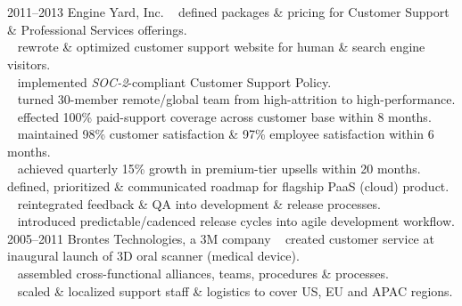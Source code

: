 \documentclass[]{friggeri-cv} %
\begin{document}
\section{{}{} {\normalsize{}~~}}

\begin{entrylist}
\entry
{2011--2013}
{Engine Yard, Inc.}
{}
{%
{\tiny {}} ~ defined packages \& pricing for Customer Support \& Professional Services offerings.\\
{\tiny {}} ~ rewrote \& optimized customer support website for human \& search engine visitors.\\
{\tiny {}} ~ implemented \emph{SOC-2}-compliant Customer Support Policy.\\
{\tiny {}} ~ turned 30-member remote/global team from high-attrition to high-performance.\\

{\tiny {}} ~ effected 100\% paid-support coverage across customer base within 8 months.\\
{\tiny {}} ~ maintained 98\% customer satisfaction \& 97\% employee satisfaction within 6 months.\\
{\tiny {}} ~ achieved quarterly 15\% growth in premium-tier upsells within 20 months.%
}
\entry
{}
{}
{}
{%
{\tiny {}} ~ defined, prioritized \& communicated roadmap for flagship PaaS (cloud) product.\\
{\tiny {}} ~ reintegrated feedback \& QA into development \& release processes.\\
{\tiny {}} ~ introduced predictable/cadenced release cycles into agile development workflow.\\%
}
\entry
{2005--2011}
{Brontes Technologies, a 3M company}
{}
{{\tiny {}} ~ created customer service at inaugural launch of 3D oral scanner (medical device).\\
{\tiny {}} ~ assembled cross-functional alliances, teams, procedures \& processes.\\
{\tiny {}} ~ scaled \& localized support staff \& logistics to cover US, EU and APAC regions.\\

}
\end{entrylist}
\end{document}

